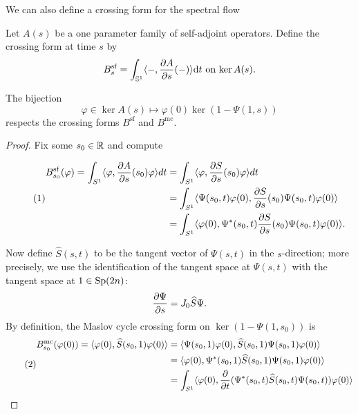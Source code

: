 We can also define a crossing form for the spectral flow
\begin{defn}
  Let $A(s)$ be a one parameter family of self-adjoint
  operators. Define the crossing form at time $s$ by
  \begin{equation*}
    B^{\text{sf}}_{s}=\int_{\mathbb{S}^{1}}\langle-,\frac{\partial A}{\partial s}(-)\rangle\mathrm{d} t\text{ on $\ker A(s)$}.
  \end{equation*}
\end{defn}
\begin{claim}
  The bijection
  \begin{equation*}
    \varphi\in \ker A(s)\mapsto \varphi(0)\ker(1-\Psi(1,s))
  \end{equation*}
  respects the crossing forms $B^{\text{sf}}$ and $B^{\text{mc}}$.
\end{claim}
\begin{proof} Fix some $s_{0}\in \mathbb{R}$ and compute

  \begin{equation*}\tag{1}
    \begin{aligned}
B^{\text{sf}}_{s_{0}}(\varphi)=\int_{S^1}\langle \varphi,\frac{\partial A}{\partial s}(s_0)\varphi\rangle dt
 &=\int_{S^1}\langle\varphi,\frac{\partial S}{\partial s}(s_0)\varphi\rangle dt\\
 &=\int_{S^1}\langle\Psi(s_0,t)\varphi(0),\frac{\partial S}{\partial
   s}(s_0)\Psi(s_0,t)\varphi(0)\rangle \\
 &=\int_{S^1}\langle\varphi(0), \Psi^{*}(s_0,t)\frac{\partial S}{\partial s}(s_0)\Psi(s_0,t)\varphi(0)\rangle.          
    \end{aligned}
  \end{equation*}


Now define $\hat{S}(s,t)$ to be the tangent vector of $\Psi(s,t)$ in the
$s$-direction; more precisely, we use the identification of the
tangent space at $\Psi(s,t)$ with the tangent space at $1\in \mathrm{Sp}(2n)$:
\[
\frac{\partial\Psi}{\partial s}=J_0\widehat{S}\Psi.
\] 
By definition, the Maslov cycle crossing form on $\ker(1-\Psi(1,s_{0}))$ is 
\begin{equation*}\tag{2}
\begin{split}
  B^{\text{mc}}_{s_{0}}(\varphi(0))=\langle\varphi(0),\widehat{S}(s_0,1)\varphi(0)\rangle&=\langle\Psi(s_0,1)\varphi(0), \widehat{S}(s_0,1)\Psi(s_0,1)\varphi(0)\rangle\\
&=\langle\varphi(0),\Psi^*(s_0,1)\widehat{S}(s_0,1)\Psi(s_0,1)\varphi(0)\rangle\\
&=\int_{S^1}\langle\varphi(0),\frac{\partial}{\partial t}(\Psi^*(s_0,t)\widehat{S}(s_0,t)\Psi(s_0,t))\varphi(0)\rangle
\end{split}
\end{equation*}


\end{proof}
